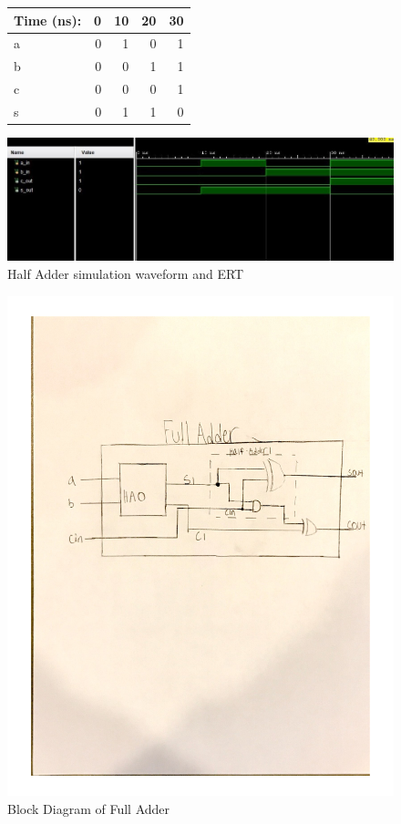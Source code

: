\documentclass[11pt]{article}
\begin{document}
\begin{figure}[ht]\centering
	\begin{tabular}{l|rrrr}
		Time (ns): & 0 & 10 & 20 & 30 \\
		\midrule 
		a & 0 & 1 & 0 & 1 \\
		b & 0 & 0 & 1 & 1 \\
		\midrule
		c & 0 & 0 & 0 & 1 \\
		s & 0 & 1 & 1 & 0 \\ 
		\bottomrule
	\end{tabular}\medskip
	
	\includegraphics[width=1.0\textwidth]{HalfAdder}
	\caption{Half Adder simulation waveform and ERT}
	\label{fig:sim_with_table}
\end{figure}


\clearpage

\begin{figure}
	\includegraphics[width=1.0\textwidth]{"FullAdderDia"}
	\caption{Block Diagram of Full Adder}
\end{figure}
\clearpage
\end{document}
